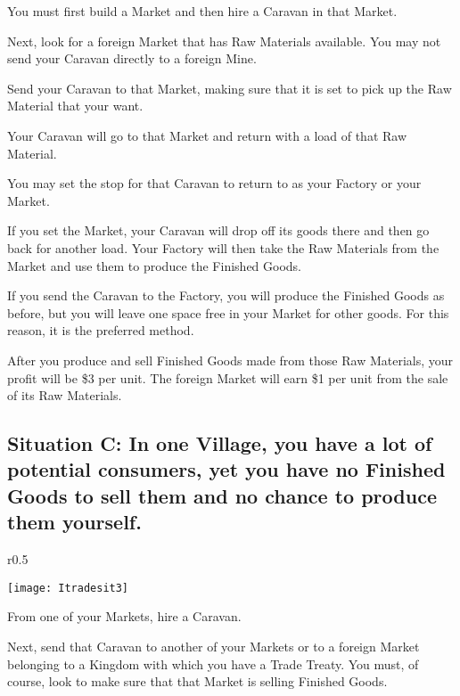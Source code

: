 You must first build a Market and then hire a Caravan in that Market.

Next, look for a foreign Market that has Raw Materials available. You may not send your Caravan directly to a foreign Mine.

Send your Caravan to that Market, making sure that it is set to pick up the Raw Material that your want.

Your Caravan will go to that Market and return with a load of that Raw Material.

You may set the stop for that Caravan to return to as your Factory or your Market.


If you set the Market, your Caravan will drop off its goods there and then go back for another load. Your Factory will then take the Raw Materials from the Market and use them to produce the Finished Goods.

If you send the Caravan to the Factory, you will produce the Finished Goods as before, but you will leave one space free in your Market for other goods. For this reason, it is the preferred method.

After you produce and sell Finished Goods made from those Raw Materials, your profit will be \$3 per unit. The foreign Market will earn \$1 per unit from the sale of its Raw Materials.

\clearpage

\subsection{Situation C: In one Village, you have a lot of potential consumers, yet you have no Finished Goods to sell them and no chance to produce them yourself.}

\begin{wrapfigure}{r}{0.5\textwidth}
	\vspace{-20pt}
	\begin{center}
		\texttt{[image: Itradesit3]}
	\end{center}
	\vspace{-20pt}
\end{wrapfigure}

From one of your Markets, hire a Caravan.

Next, send that Caravan to another of your Markets or to a foreign Market belonging to a Kingdom with which you have a Trade Treaty. You must, of course, look to make sure that that Market is selling Finished Goods.

